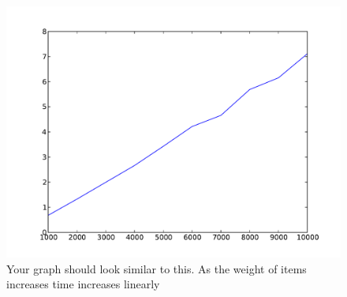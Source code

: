 \begin{figure}[H]
\includegraphics[scale = .5]{dynamicWeight.pdf}
\caption{Your graph should look similar to this. As the weight of items increases time increases linearly}
\end{figure}
